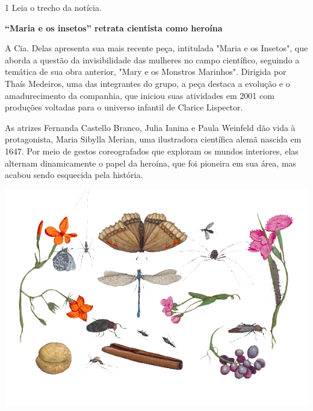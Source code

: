 


\num{1} Leia o trecho da notícia.

\begin{myquote}

\textbf{``Maria e os insetos'' retrata cientista como heroína}

A Cia. Delas apresenta sua mais recente peça, intitulada "Maria e os Insetos", que aborda a questão da invisibilidade das mulheres no campo científico, seguindo a temática de sua obra anterior, "Mary e os Monstros Marinhos". Dirigida por Thaís Medeiros, uma das integrantes do grupo, a peça destaca a evolução e o amadurecimento da companhia, que iniciou suas atividades em 2001 com produções voltadas para o universo infantil de Clarice Lispector.

As atrizes Fernanda Castello Branco, Julia Ianina e Paula Weinfeld dão vida à protagonista, Maria Sibylla Merian, uma ilustradora científica alemã nascida em 1647. Por meio de gestos coreografados que exploram os mundos interiores, elas alternam dinamicamente o papel da heroína, que foi pioneira em sua área, mas acabou sendo esquecida pela história.

\begin{center}
\includegraphics[width=\textwidth]{./media/image23e.png}
\end{center}

\end{myquote}

